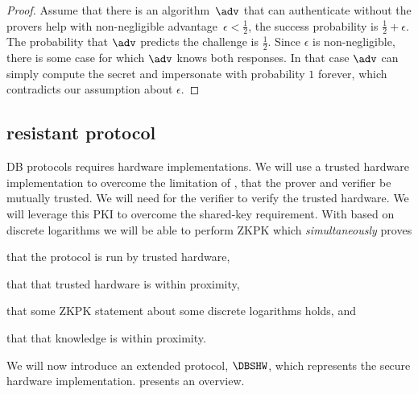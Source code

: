\begin{proof}
  Assume that there is an algorithm~\(\adv\) that can authenticate without the 
  provers help with non-negligible advantage~\(\epsilon < \frac{1}{2}\), \ie 
  the success probability is \(\frac{1}{2}+\epsilon\).
  The probability that \(\adv\) predicts the challenge is \(\frac{1}{2}\).
  Since \(\epsilon\) is non-negligible, there is some case for which \(\adv\) 
  knows both responses.
  In that case \(\adv\) can simply compute the secret and impersonate with 
  probability \(1\) forever, which contradicts our assumption about 
  \(\epsilon\).
\end{proof}

\subsection{ resistant protocol}

\Acl{DB} protocols requires hardware implementations.
We will use a trusted hardware implementation to overcome the limitation of 
\textcite{UWBPR}, \ie that the prover and verifier be mutually trusted.
We will need  for the verifier to verify the trusted hardware.
We will leverage this \ac{PKI} to overcome the shared-key requirement.
With  based on discrete logarithms we will be able to perform  
\ac{ZKPK} which \emph{simultaneously} proves
\begin{enumerate*}
\item that the protocol is run by trusted hardware,
\item that that trusted hardware is within proximity,
\item that some \ac{ZKPK} statement about some discrete logarithms holds, and
\item that that knowledge is within proximity.
\end{enumerate*}

We will now introduce an extended protocol, \(\DBSHW\), which represents the 
secure hardware implementation.
 presents an overview.

